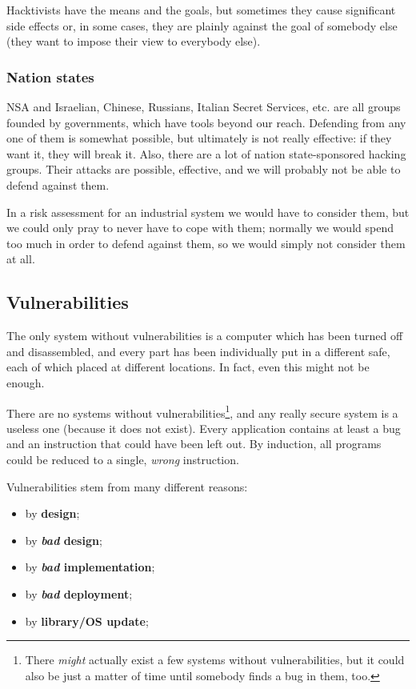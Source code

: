 \vspace{0.5em}

Hacktivists have the means and the goals, but sometimes they cause significant side effects or, in some cases, they are plainly against the goal of somebody else (they want to impose their view to everybody else).


\subsubsection*{Nation states}
NSA and Israelian, Chinese, Russians, Italian Secret Services, etc. are all groups founded by governments, which have tools beyond our reach. Defending from any one of them is somewhat possible, but ultimately is not really effective: if they want it, they will break it. Also, there are a lot of nation state-sponsored hacking groups. Their attacks are possible, effective, and we will probably not be able to defend against them.

In a risk assessment for an industrial system we would have to consider them, but we could only pray to never have to cope with them; normally we would spend too much in order to defend against them, so we would simply not consider them at all.


\subsection{Vulnerabilities}
The only system without vulnerabilities is a computer which has been turned off and disassembled, and every part has been individually put in a different safe, each of which placed at different locations. In fact, even this might not be enough. 

There are no systems without vulnerabilities\footnote{There \textit{might} actually exist a few systems without vulnerabilities, but it could also be just a matter of time until somebody finds a bug in them, too.}, and any really secure system is a useless one (because it does not exist). Every application contains at least a bug and an instruction that could have been left out. By induction, all programs could be reduced to a single, \textit{wrong} instruction.

Vulnerabilities stem from many different reasons:

\begin{itemize}
    \item by \textbf{design};
    \item by \textbf{\textit{bad} design};
    \item by \textbf{\textit{bad} implementation};
    \item by \textbf{\textit{bad} deployment};
    \item by \textbf{library/OS update};
\end{itemize}

